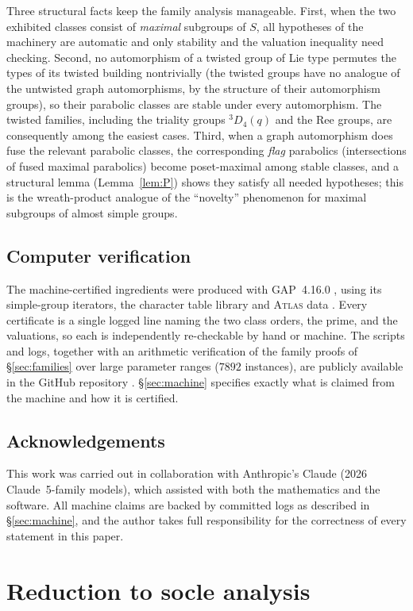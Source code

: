 \documentclass[11pt]{amsart}
\theoremstyle{definition}
\theoremstyle{remark}
\begin{document}
Three structural facts keep the family analysis manageable. First, when
the two exhibited classes consist of \emph{maximal} subgroups of $S$, all
hypotheses of the machinery are automatic and only stability and the
valuation inequality need checking. Second, no automorphism of a twisted
group of Lie type permutes the types of its twisted building nontrivially
(the twisted groups have no analogue of the untwisted graph
automorphisms, by the structure of their automorphism groups), so their
parabolic classes are stable under every automorphism. The twisted families,
including the triality groups ${}^3D_4(q)$ and the Ree groups, are
consequently among the easiest cases.
Third, when a graph automorphism does fuse the relevant parabolic classes,
the corresponding \emph{flag} parabolics (intersections of fused maximal
parabolics) become poset-maximal among stable classes, and a structural
lemma (Lemma~\ref{lem:P}) shows they satisfy all needed hypotheses; this
is the wreath-product analogue of the ``novelty'' phenomenon for maximal
subgroups of almost simple groups.

\subsection*{Computer verification}
The machine-certified ingredients were produced with GAP~4.16.0
\cite{GAP}, using its simple-group iterators, the character table library
\cite{CTblLib} and \textsc{Atlas} data \cite{ATLAS}. Every certificate is
a single logged line naming the two class orders, the prime, and the
valuations, so each is independently re-checkable by hand or machine. The
scripts and logs, together with an arithmetic verification of the family
proofs of \S\ref{sec:families} over large parameter ranges ($7892$
instances), are publicly available in the GitHub repository
\cite{Repo}. \S\ref{sec:machine} specifies exactly what is claimed from
the machine and how it is certified.

\subsection*{Acknowledgements}
This work was carried out in collaboration with Anthropic's Claude
(2026 Claude~5-family models), which assisted with both the mathematics
and the software. All machine claims are backed by committed logs as
described in \S\ref{sec:machine}, and the author takes full
responsibility for the correctness of every statement in this paper.

\section{Reduction to socle analysis}\label{sec:reduction}
\end{document}
